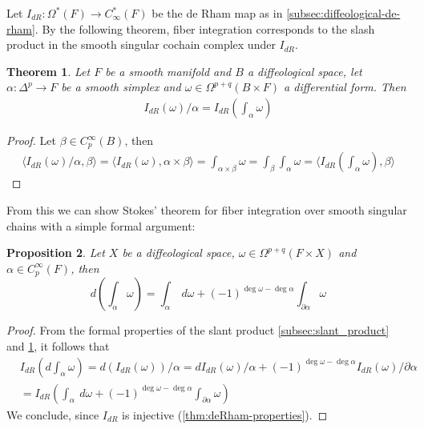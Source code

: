 \documentclass{scrartcl}
\theoremstyle{plain}
\newtheorem{theorem}{Theorem}[section]
\newtheorem{proposition}[theorem]{Proposition}
\theoremstyle{definition}
\begin{document}
Let $I_{dR}\colon \Omega^*(F)\to C_\infty^*(F)$ be the de Rham map as in \cref{subsec:diffeological-de-rham}. By the following theorem, fiber integration corresponds to the slash product in the smooth singular cochain complex under $I_{dR}$.
\begin{theorem}\label{thm:fiber-integral-slash-product}
    Let $F$ be a smooth manifold and $B$ a diffeological space, let $\alpha\colon\Delta^p\to F$ be a smooth simplex and $\omega\in\Omega^{p+q}(B\times F)$ a differential form. Then
    \begin{align*}
        I_{dR}(\omega) / \alpha = I_{dR}\left(\int_{\alpha} \omega\right)
    \end{align*}
\end{theorem}
\begin{proof}
    Let $\beta\in C^\infty_p(B)$, then
    \begin{align*}
        \langle I_{dR}(\omega) / \alpha, \beta\rangle = \langle I_{dR}(\omega), \alpha\times \beta\rangle = \int_{\alpha\times \beta} \omega = \int_\beta \int_\alpha\omega = \langle I_{dR}\left(\int_{\alpha}\omega\right), \beta\rangle
    \end{align*}
\end{proof}

From this we can show Stokes' theorem for fiber integration over smooth singular chains with a simple formal argument:
\begin{proposition}\label{thm:fiber-stokes}
    Let $X$ be a diffeological space, $\omega\in\Omega^{p+q}(F\times X)$ and $\alpha\in C_p^\infty(F)$, then
    $$d\left(\int_\alpha\omega\right) = \int_\alpha\ d\omega + (-1)^{\deg \omega - \deg\alpha}\int_{\partial \alpha} \omega$$
\end{proposition}
\begin{proof}
    From the formal properties of the slant product \cref{subsec:slant_product} and \ref{thm:fiber-integral-slash-product}, it follows that
    \begin{align*}
        &I_{dR}\left(d\int_\alpha\omega\right) = d (I_{dR}(\omega)) / \alpha = dI_{dR}(\omega) / \alpha + (-1)^{\deg \omega - \deg \alpha}I_{dR}(\omega) / \partial \alpha \\&= I_{dR}\left(\int_\alpha\ d\omega + (-1)^{\deg \omega - \deg\alpha}\int_{\partial \alpha} \omega\right)
    \end{align*}
    We conclude, since $I_{dR}$ is injective (\ref{thm:deRham-properties}).
\end{proof}
\end{document}
